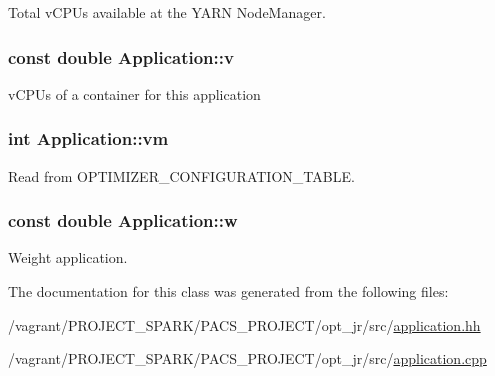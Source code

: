 Total v\-C\-P\-Us available at the Y\-A\-R\-N Node\-Manager. 

\hypertarget{classApplication_a57853498c230af817bc4173169847bfc}{
\subsubsection[{v}]{\setlength{\rightskip}{0pt plus 5cm}const double Application\-::v\hspace{0.3cm}{\ttfamily [private]}}}\label{classApplication_a57853498c230af817bc4173169847bfc}


v\-C\-P\-Us of a container for this application 

\hypertarget{classApplication_a0a3fe386eb8244e536bc5297709d1269}{
\subsubsection[{vm}]{\setlength{\rightskip}{0pt plus 5cm}int Application\-::vm\hspace{0.3cm}{\ttfamily [private]}}}\label{classApplication_a0a3fe386eb8244e536bc5297709d1269}


Read from O\-P\-T\-I\-M\-I\-Z\-E\-R\-\_\-\-C\-O\-N\-F\-I\-G\-U\-R\-A\-T\-I\-O\-N\-\_\-\-T\-A\-B\-L\-E. 

\hypertarget{classApplication_a89e171cf287b09ce4b37dd94c0d61e2b}{
\subsubsection[{w}]{\setlength{\rightskip}{0pt plus 5cm}const double Application\-::w\hspace{0.3cm}{\ttfamily [private]}}}\label{classApplication_a89e171cf287b09ce4b37dd94c0d61e2b}


Weight application. 



The documentation for this class was generated from the following files\-:\begin{DoxyCompactItemize}
\item 
/vagrant/\-P\-R\-O\-J\-E\-C\-T\-\_\-\-S\-P\-A\-R\-K/\-P\-A\-C\-S\-\_\-\-P\-R\-O\-J\-E\-C\-T/opt\-\_\-jr/src/\hyperlink{application_8hh}{application.\-hh}\item 
/vagrant/\-P\-R\-O\-J\-E\-C\-T\-\_\-\-S\-P\-A\-R\-K/\-P\-A\-C\-S\-\_\-\-P\-R\-O\-J\-E\-C\-T/opt\-\_\-jr/src/\hyperlink{application_8cpp}{application.\-cpp}\end{DoxyCompactItemize}
